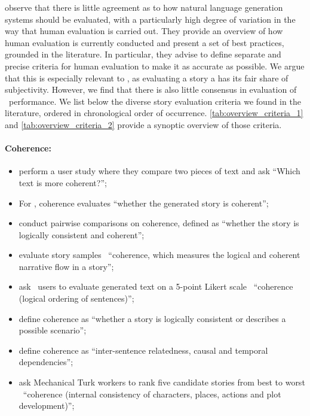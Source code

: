 \citet{lee-etal-2019-best} observe that there is little agreement as to how natural language generation systems should be evaluated, with a particularly high degree of variation in the way that human evaluation is carried out. They provide an overview of how human evaluation is currently conducted and present a set of best practices, grounded in the literature. In particular, they advise to define separate and precise criteria for human evaluation to make it as accurate as possible.
We argue that this is especially relevant to \asg, as evaluating a story a has its fair share of subjectivity. However, we find that there is also little consensus in evaluation of \asg\ performance. We list below the diverse story evaluation criteria we found in the literature, ordered in chronological order of occurrence. \autoref{tab:overview_criteria_1} and \autoref{tab:overview_criteria_2} provide a synoptic overview of those criteria.

\paragraph{Coherence:}
\begin{itemize}[nolistsep]
    \item \citet{khalifa2017deeptingle} perform a user study where they compare two pieces of text and ask ``Which text is more coherent?'';
    \item For \citet{xu-etal-2018-skeleton}, coherence evaluates ``whether the generated story is coherent'';
    \item \citet{yao2019plan} conduct pairwise comparisons on coherence, defined as ``whether the story is logically consistent and coherent'';
    \item \citet{jhamtani-berg-kirkpatrick-2020-narrative} evaluate story samples \wrt\ ``coherence, which measures the logical and coherent narrative flow in a story'';
    \item \citet{akoury2020storium} ask \storium\ users to evaluate generated text on a 5-point Likert scale \wrt\ ``coherence (logical ordering of sentences)'';
    \item \citet{wang2020narrative} define coherence as ``whether a story is logically consistent or describes a possible scenario'';
    \item \citet{guan2021long} define coherence as ``inter-sentence relatedness, causal and temporal dependencies'';
    \item \citet{wilmot2021temporal} ask Mechanical Turk workers to rank five candidate stories from best to worst \wrt\ ``coherence (internal consistency of characters, places, actions and plot development)'';
\end{itemize}

